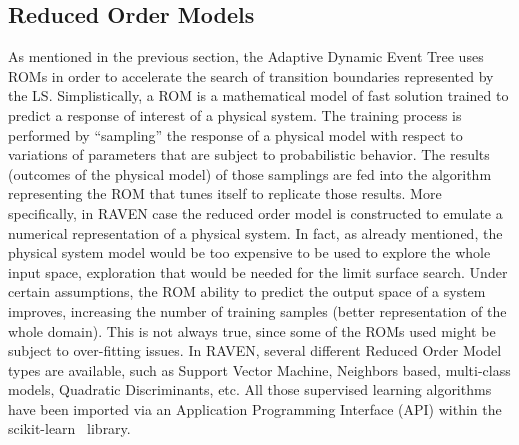 \subsection{Reduced Order Models} 
\label{sec:ROMs}
As mentioned in the previous section, the Adaptive Dynamic Event Tree uses ROMs in order to accelerate the search of transition boundaries represented by the LS. Simplistically, a ROM is a mathematical model of fast solution trained to predict a response of interest of a physical system. The training process is performed by “sampling” the response of a physical model with respect to variations of parameters that are subject to probabilistic behavior. The results (outcomes of the physical model) of those samplings are fed into the algorithm representing the ROM that tunes itself to replicate those results. More specifically, in RAVEN case the reduced order model is constructed to emulate a numerical representation of a physical system. In fact, as already mentioned, the physical system model would be too expensive to be used to explore the whole input space, exploration that would be needed for the limit surface search. Under certain assumptions, the ROM ability to predict the output space of a system improves, increasing the number of training samples (better representation of the whole domain).  This is not always true, since some of the ROMs used might be subject to over-fitting issues.
In RAVEN, several different Reduced Order Model types are available, such as Support Vector Machine, Neighbors based, multi-class models, Quadratic Discriminants, etc. All those supervised learning algorithms have been imported via an Application Programming Interface (API) within the scikit-learn~\cite{scikitlearn} library.

